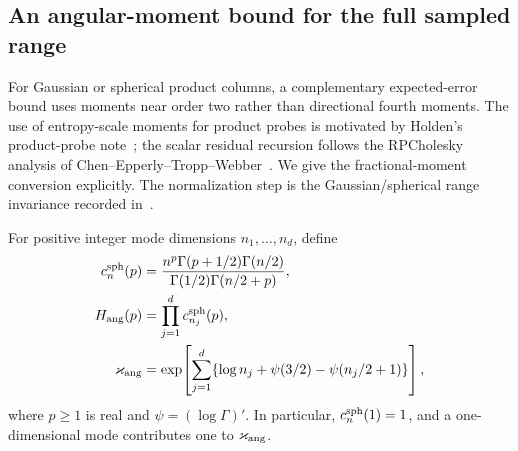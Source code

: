\documentclass[11pt,a4paper]{article}
\theoremstyle{definition}\newtheorem{definition}[theorem]{Definition}
\theoremstyle{remark}\newtheorem{remark}[theorem]{Remark}
\numberwithin{equation}{section}
\begin{document}
\subsection{An angular-moment bound for the full sampled range}
\label{app:sec:angular-drift}

For Gaussian or spherical product columns, a complementary expected-error
bound uses moments near order two rather than directional fourth moments.
The use of entropy-scale moments for product probes is motivated by
Holden's product-probe note~\cite{Holden2026}; the scalar residual
recursion follows the RPCholesky analysis of
Chen--Epperly--Tropp--Webber~\cite{CETW2025}. We give the fractional-moment
conversion explicitly. The normalization step is the Gaussian/spherical
range invariance recorded in~\cite[Section~5.4]{CEMT2025}.

For positive integer mode dimensions $n_1,\ldots,n_d$, define
\begin{equation}\label{app:eq:angular-kappa}
 \begin{split}
 c_n^{\rm sph}(p)&=\frac{n^p\Gamma(p+1/2)\Gamma(n/2)}
                    {\Gamma(1/2)\Gamma(n/2+p)},\\
 H_{\rm ang}(p)&=\prod_{j=1}^d c_{n_j}^{\rm sph}(p),\\
 \varkappa_{\rm ang}
 &=\exp\!\left[\sum_{j=1}^d
   \{\log n_j+\psi(3/2)-\psi(n_j/2+1)\}\right],
 \end{split}
\end{equation}
where $p\ge1$ is real and $\psi=(\log\Gamma)'$.
In particular, $c_n^{\rm sph}(1)=1$, and a one-dimensional mode contributes one
to $\varkappa_{\rm ang}$.
\end{document}

